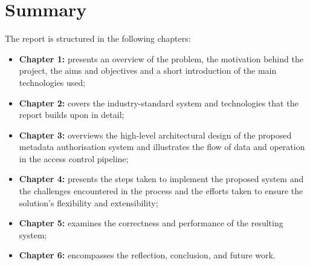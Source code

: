 \section{Summary}

The report is structured in the following chapters:

\begin{itemize}
    \item \textbf{Chapter 1: } presents an overview of the problem, the motivation behind the project, the aims and objectives and a short introduction of the main technologies used;
    \item \textbf{Chapter 2: } covers the industry-standard system and technologies that the report builds upon in detail;
    \item \textbf{Chapter 3: } overviews the high-level architectural design of the proposed metadata authorisation system and illustrates the flow of data and operation in the access control pipeline;
    \item \textbf{Chapter 4: } presents the steps taken to implement the proposed system and the challenges encountered in the process and the efforts taken to ensure the solution's flexibility and extensibility;
    \item \textbf{Chapter 5: } examines the correctness and performance of the resulting system;
    \item \textbf{Chapter 6: } encompasses the reflection, conclusion, and future work.
\end{itemize}